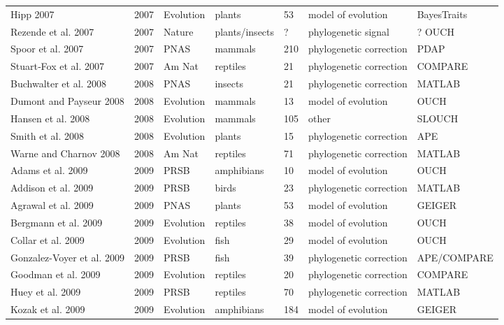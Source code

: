 \documentclass[a4paper,12pt]{article}
\begin{document}
\begin{landscape}
\begin{center}
\begin{longtable}{p{6cm}llllll}
Hipp 2007 &   2007    &   Evolution   &   plants  &   53  &   model of evolution  &   BayesTraits \\
Rezende et al. 2007   &   2007    &   Nature  &   plants/insects  &   ?   &   phylogenetic signal &   ? OUCH    \\
Spoor et al. 2007 &   2007    &   PNAS    &   mammals &   210 &   phylogenetic correction &   PDAP    \\
Stuart‐Fox et al. 2007    &   2007    &   Am Nat  &   reptiles    &   21  &   phylogenetic correction &   COMPARE \\
Buchwalter et al. 2008    &   2008    &   PNAS    &   insects &   21  &   phylogenetic correction &   MATLAB  \\
Dumont and Payseur 2008   &   2008    &   Evolution   &   mammals &   13  &   model of evolution  &   OUCH    \\
Hansen et al. 2008    &   2008    &   Evolution   &   mammals &   105 &   other   &   SLOUCH  \\
Smith et al. 2008 &   2008    &   Evolution   &   plants  &   15  &   phylogenetic correction &   APE \\
Warne and Charnov 2008    &   2008    &   Am Nat  &   reptiles    &   71  &   phylogenetic correction &   MATLAB  \\
Adams et al. 2009 &   2009    &   PRSB    &   amphibians  &   10  &   model of evolution  &   OUCH    \\
Addison et al. 2009   &   2009    &   PRSB    &   birds   &   23  &   phylogenetic correction &   MATLAB  \\
Agrawal et al. 2009   &   2009    &   PNAS    &   plants  &   53  &   model of evolution  &   GEIGER  \\
Bergmann et al. 2009  &   2009    &   Evolution   &   reptiles    &   38  &   model of evolution  &   OUCH    \\
Collar et al. 2009    &   2009    &   Evolution   &   fish    &   29  &   model of evolution  &   OUCH    \\
Gonzalez-Voyer et al. 2009    &   2009    &   PRSB    &   fish    &   39  &   phylogenetic correction &   APE/COMPARE \\
Goodman et al. 2009   &   2009    &   Evolution   &   reptiles    &   20  &   phylogenetic correction &   COMPARE \\
Huey et al. 2009  &   2009    &   PRSB    &   reptiles    &   70  &   phylogenetic correction &   MATLAB  \\
Kozak et al. 2009 &   2009    &   Evolution   &   amphibians  &   184 &   model of evolution  &   GEIGER  \\

\end{longtable}
\end{center}
\end{landscape}
\end{document}
